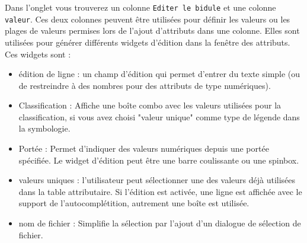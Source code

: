 Dans l'onglet  vous trouverez un colonne \texttt{Editer le bidule} et une colonne \texttt{valeur}. Ces deux colonnes peuvent être utilisées pour définir les valeurs ou les plages de valeurs permises lors de l'ajout d'attributs dans une colonne. Elles sont utilisées pour générer différents widgets d'édition dans la fenêtre des attributs. Ces widgets sont :
\begin{itemize}
\begin{itemize}
\item édition de ligne : un champ d'édition qui permet d'entrer du texte simple (ou de restreindre à des nombres pour des attributs de type numériques).
\item Classification : Affiche une boîte combo avec les valeurs utilisées pour la classification, si vous avez choisi "valeur unique" comme type de légende dans la symbologie.
\item Portée : Permet d'indiquer des valeurs numériques depuis une portée spécifiée. Le widget d'édition peut être une barre coulissante ou une spinbox.
\item valeurs uniques : l'utilisateur peut sélectionner une des valeurs déjà utilisées dans la table attributaire. Si l'édition est activée, une ligne est affichée avec le support de l'autocomplétition, autrement une boîte est utilisée.
\item nom de fichier : Simplifie la sélection par l'ajout d'un dialogue de sélection de fichier.

\end{itemize}
\end{itemize}
